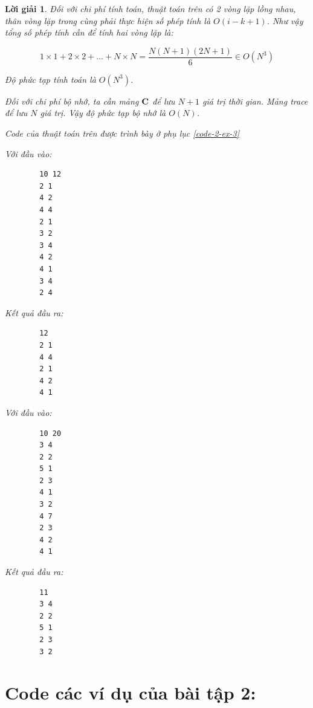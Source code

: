 \documentclass[14pt, a4paper]{article}
\theoremstyle{sltheorem}
\theoremstyle{soltheorem}
\newtheorem*{loigiai}{Lời giải}
\begin{document}
\begin{loigiai}
    Đối với chi phí tính toán, thuật toán trên có 2 vòng lặp lồng nhau, thân vòng lặp trong cùng phải thực hiện số phép tính là $O(i-k+1)$.
    Như vậy tổng số phép tính cần để tính hai vòng lặp là:

    \begin{equation*}
        1 \times 1 + 2 \times 2 + \dots + N \times N = \dfrac{N (N+1)(2N + 1)}{6} \in O(N^3)
    \end{equation*}

    Độ phức tạp tính toán là $O(N^3)$.

    Đối với chi phí bộ nhớ, ta cần mảng $\bold{C}$ để lưu $N+1$ giá trị thời gian. Mảng trace để lưu $N$ giá trị.
    Vậy độ phức tạp bộ nhớ là $O(N)$.

    Code của thuật toán trên được trình bày ở phụ lục \ref{code-2-ex-3}

    Với đầu vào:

    \begin{verbatim}
        10 12
        2 1    
        4 2
        4 4
        2 1
        3 2
        3 4
        4 2
        4 1
        3 4
        2 4
    \end{verbatim}

    Kết quả đầu ra:

    \begin{verbatim}
        12
        2 1
        4 4
        2 1
        4 2
        4 1
    \end{verbatim}

    Với đầu vào:

    \begin{verbatim}
        10 20
        3 4
        2 2
        5 1
        2 3 
        4 1
        3 2
        4 7
        2 3
        4 2
        4 1
    \end{verbatim}

    Kết quả đầu ra:

    \begin{verbatim}
        11
        3 4
        2 2
        5 1
        2 3
        3 2
    \end{verbatim}

    \end{loigiai}

    
    \newpage
    \printbibliography[title={TÀI LIỆU THAM KHẢO}]

    \newpage

    \appendix

    \section{Code các ví dụ của bài tập 2:}
\end{document}
